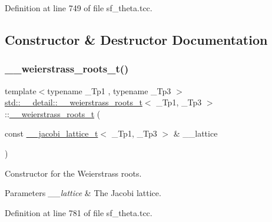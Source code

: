 Definition at line 749 of file sf\+\_\+theta.\+tcc.



\subsection{Constructor \& Destructor Documentation}
\mbox{\label{structstd_1_1____detail_1_1____weierstrass__roots__t_ae198e5213d170ad03e1b33f2a2bd4755}} 
\subsubsection{\texorpdfstring{\+\_\+\+\_\+weierstrass\+\_\+roots\+\_\+t()}{\_\_weierstrass\_roots\_t()}\hspace{0.1cm}{\footnotesize\ttfamily [1/2]}}
{\footnotesize\ttfamily template$<$typename \+\_\+\+Tp1 , typename \+\_\+\+Tp3 $>$ \\
\hyperlink{structstd_1_1____detail_1_1____weierstrass__roots__t}{std\+::\+\_\+\+\_\+detail\+::\+\_\+\+\_\+weierstrass\+\_\+roots\+\_\+t}$<$ \+\_\+\+Tp1, \+\_\+\+Tp3 $>$\+::\hyperlink{structstd_1_1____detail_1_1____weierstrass__roots__t}{\+\_\+\+\_\+weierstrass\+\_\+roots\+\_\+t} (\begin{DoxyParamCaption}\item[{const \hyperlink{structstd_1_1____detail_1_1____jacobi__lattice__t}{\+\_\+\+\_\+jacobi\+\_\+lattice\+\_\+t}$<$ \+\_\+\+Tp1, \+\_\+\+Tp3 $>$ \&}]{\+\_\+\+\_\+lattice }\end{DoxyParamCaption})\hspace{0.3cm}{\ttfamily [explicit]}}

Constructor for the Weierstrass roots.


\begin{DoxyParams}{Parameters}
{\em \+\_\+\+\_\+lattice} & The Jacobi lattice. \\
\hline
\end{DoxyParams}


Definition at line 781 of file sf\+\_\+theta.\+tcc.



